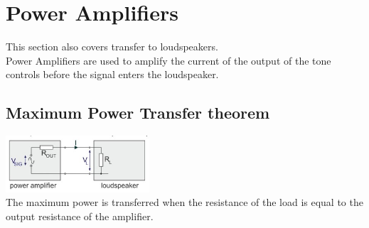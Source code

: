 \documentclass[a4paper, 11pt, twocolumn]{article}
\begin{document}
    \section{Power Amplifiers}
    This section also covers transfer to loudspeakers.\\
    Power Amplifiers are used to amplify the current of the output of the tone controls before the signal enters the loudspeaker.
    \subsection{Maximum Power Transfer theorem}
    \includegraphics[width=0.4\textwidth]{paToLs.jpg}\\
    The maximum power is transferred when the resistance of the load is equal to the output resistance of the amplifier.
\end{document}
